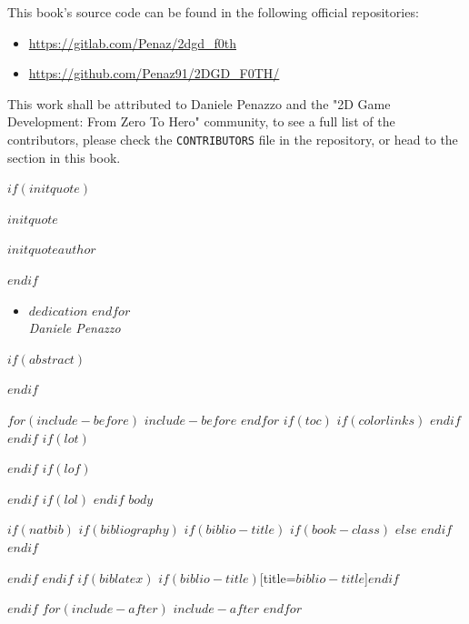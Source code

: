 \documentclass{article}
\begin{document}
This book's source code can be found in the following official repositories:

\begin{itemize}
    \item \url{https://gitlab.com/Penaz/2dgd_f0th}
    \item \url{https://github.com/Penaz91/2DGD_F0TH/}
\end{itemize}

\vspace{24pt}

This work shall be attributed to Daniele Penazzo and the "2D Game Development: From Zero To Hero" community, to see a full list of the contributors, please check the \texttt{CONTRIBUTORS} file in the repository, or head to the  section in this book.

\clearpage

\clearpage
\null
\vfill
\begin{minipage}[b]{\textwidth}
$if(initquote)$
\epigraph{$initquote$}{\textit{$initquoteauthor$}}
$endif$
\begin{itemize}[label={}]
    $for(dedication)$
        \item $dedication$
    $endfor$\\
    \textit{Daniele Penazzo}
\end{itemize}
\end{minipage}
\vfill
\cleardoublepage
\pagestyle{fancy}
\normalsize
$if(abstract)$
\begin{abstract}
$abstract$
\end{abstract}
$endif$

$for(include-before)$
$include-before$
$endfor$
$if(toc)$
{
$if(colorlinks)$
\hypersetup{linkcolor=$if(toccolor)$$toccolor$$else$black$endif$}
$endif$
\setcounter{tocdepth}{$toc-depth$}
\clearpage
\pagestyle{empty}
\null\clearpage
\pagestyle{fancy}
\tableofcontents
\clearpage
}
$endif$
$if(lot)$
\listoftables
$endif$
$if(lof)$
\listoffigures
$endif$
$if(lol)$
\lstlistoflistings
$endif$
\clearpage
{}
$body$

$if(natbib)$
$if(bibliography)$
$if(biblio-title)$
$if(book-class)$
\renewcommand\bibname{$biblio-title$}
$else$
\renewcommand\refname{$biblio-title$}
$endif$
$endif$


$endif$
$endif$
$if(biblatex)$
\printbibliography$if(biblio-title)$[title=$biblio-title$]$endif$

$endif$
$for(include-after)$
$include-after$
\pagebreak
$endfor$
\end{document}
